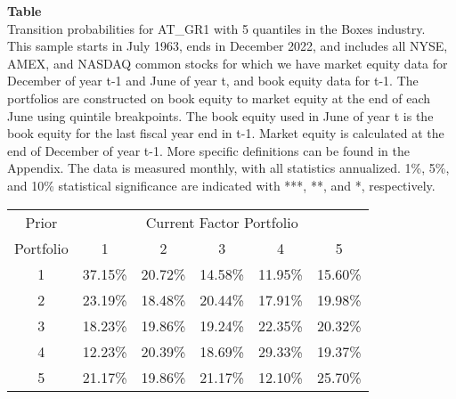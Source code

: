 \begin{table*}[ht!]
\raggedright
{}
\label{tab: transition_probs_AT_GR1_Boxes_with_5_quantiles}
\textbf{Table \thetable} \\
Transition probabilities for AT_GR1 with 5 quantiles in the Boxes industry. \\
\hspace*{1em}This sample starts in July 1963, ends in December 2022, and includes all NYSE, AMEX, and NASDAQ common stocks for which we have market equity data for December of year t-1 and June of year t, and book equity data for t-1. The portfolios are constructed on book equity to market equity at the end of each June using quintile breakpoints.  The book equity used in June of year t is the book equity for the last fiscal year end in t-1.  Market equity is calculated at the end of December of year t-1.  More specific definitions can be found in the Appendix.  The data is measured monthly, with all statistics annualized.  1\%, 5\%, and 10\% statistical significance are indicated with ***, **, and *, respectively. \\
\vspace{0.5em}
\centering
\begin{adjustbox}{max width=\textwidth}
\begin{tabular}{@{}cccccc@{}}
\toprule
Prior & \multicolumn{5}{c}{Current Factor Portfolio} \\
Portfolio & 1 & 2 & 3 & 4 & 5 \\
\midrule
1 & 37.15\% & 20.72\% & 14.58\% & 11.95\% & 15.60\% \\
2 & 23.19\% & 18.48\% & 20.44\% & 17.91\% & 19.98\% \\
3 & 18.23\% & 19.86\% & 19.24\% & 22.35\% & 20.32\% \\
4 & 12.23\% & 20.39\% & 18.69\% & 29.33\% & 19.37\% \\
5 & 21.17\% & 19.86\% & 21.17\% & 12.10\% & 25.70\% \\
\bottomrule
\end{tabular}
\end{adjustbox}
\end{table*}